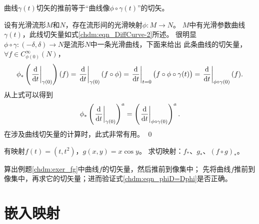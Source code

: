 \begin{example}\label{chdm:exm_phiD=Dphi}
    曲线$\gamma(t)$切矢的推前等于“曲线像$\phi\circ\gamma(t)$”的切矢。
\end{example}
设有光滑流形$M$和$N$，存在流形间的光滑映射$\phi:M\to N$。
$M$中有光滑参数曲线$\gamma(t)$，此线切矢量如式\eqref{chdm:eqn_DiffCurve-2}所述。
很明显$\phi\circ\gamma:(-\delta,\delta)\to N$是流形$N$中一条光滑曲线，下面来给出
此条曲线的切矢量，$\forall f\in C^\infty_{\phi(0)}(N)$，
\begin{align*}
    \phi_{*}\left(\left.\frac{{\rm d}  }{{\rm d} t}\right|_{\gamma(0)}\right) (f)
    = \left.\frac{{\rm d}  }{{\rm d} t}\right|_{\gamma(0)} (f\circ \phi)
    = \left.\frac{{\rm d}  }{{\rm d} t}\right|_{t=0} \bigl(f\circ \phi\circ\gamma(t)\bigr)
    = \left.\frac{{\rm d}  }{{\rm d} t}\right|_{\phi\circ\gamma(0)} (f) .
\end{align*}
从上式可以得到
\begin{equation}\label{chdm:eqn_phiD=Dphi}
    \phi_{*}\left(\left.\frac{{\rm d}  }{{\rm d} t}\right|_{\gamma(0)}\right)^a
    = \left(\left.\frac{{\rm d}  }{{\rm d} t}\right|_{\phi\circ\gamma(0)}\right)^a.
\end{equation}
在涉及曲线切矢量的计算时，此式非常有用。  
\qed


\begin{exercise}\label{chdm:exer_fg}
	有映射$f(t)=(t,t^2)$，$g(x,y)=x \cos y$。
	求切映射：$f_*$、$g_*$、$(f\circ g)_*$。
\end{exercise}

\begin{exercise}
	算出例题\ref{chdm:exer_fg}中曲线$f$的切矢量，然后推前到像集中；
	先将曲线$f$推前到像集中，再求它的切矢量；进而验证式\eqref{chdm:eqn_phiD=Dphi}是否正确。
\end{exercise}

\section{嵌入映射}\label{chdm:sec_sub-manifold}


